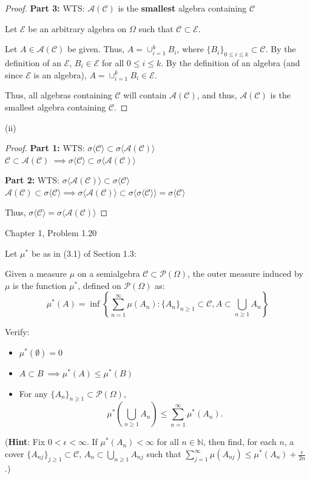 \documentclass[12pt,letterpaper, onecolumn]{exam}
\newcommand{\nat}{\mathbb{N}}
\newcommand{\power}{\mathcal{P}}
\newcommand{\calA}{\mathcal{A}}
\newcommand{\calC}{\mathcal{C}}
\newcommand{\gensig}[1]{\sigma\langle #1 \rangle} %
\newcommand{\om}{\mu^*} %
\begin{document}
\begin{questions}
\begin{solution}
\begin{proof}
    \textbf{Part 3:} WTS: $\calA(\calC)$ is the \textbf{smallest} algebra containing $\calC$

    Let $\mathcal{E}$ be an arbitrary algebra on $\Omega$ such that $\calC \subset \mathcal{E}$.

    Let $A \in \calA(\calC)$ be given. Thus, $A = \cup_{i = 1}^k B_i$, where $\{B_i\}_{0 \leq i \leq k} \subset \calC$. By the definition of an $\mathcal{E}$, $B_i \in \mathcal{E}$ for all $0 \leq i \leq k$. By the definition of an algebra (and since $\mathcal{E}$ is an algebra), $A = \cup_{i = 1}^k B_i \in \mathcal{E}$.
    
    Thus, all algebras containing $\calC$ will contain $\calA(\calC)$, and thus, $\calA(\calC)$ is the smallest algebra containing $\calC$.
    \end{proof}
    
    (ii)
    \begin{proof}
        \textbf{Part 1:} WTS: $\gensig{\calC} \subset \gensig{\calA(\calC)}$ \\
        $\calC \subset \calA(\calC) \: \implies \gensig{\calC} \subset \gensig{\calA(\calC)}$


        \textbf{Part 2:} WTS: $ \gensig{\calA(\calC)} \subset \gensig{\calC}$ \\
        $\calA(\calC) \subset \gensig{\calC} \implies \gensig{\calA(\calC)} \subset \gensig{\gensig{\calC}} = \gensig{\calC}$

        Thus, $\gensig{\calC} = \gensig{\calA(\calC)}$
    \end{proof}
    \end{solution}

    \question Chapter 1, Problem 1.20
    
    Let $\mu^*$ be as in (3.1) of Section 1.3: 
    
    Given a measure $\mu$ on a semialgebra $\calC \subset \power(\Omega)$, the outer measure induced by $\mu$ is the function $\mu^*$, defined on $\power(\Omega)$ as:
            \[\mu^*(A) = \inf\left\{\sum_{n = 1}^\infty \mu(A_n): \{A_n\}_{n \geq 1} \subset \calC, A \subset \bigcup_{n \geq 1} A_n\right\}\]
            
    Verify:
    \begin{itemize}
        \item[(3.4)] $\om (\emptyset) = 0$
        \item[(3.5)] $A \subset B \: \implies \om(A) \leq \om(B)$
        \item[(3.6)] For any $\{A_n\}_{n \geq 1} \subset \power(\Omega)$, 
        \[\om\left(\bigcup_{n \geq 1} A_n\right) \leq \sum_{n = 1}^\infty \om(A_n).\]
    \end{itemize}
    (\textbf{Hint}: Fix $0 <\epsilon<\infty$. If $\mu^*(A_n) < \infty$ for all $n \in \nat$, then find, for each $n$, a cover $\{A_{nj}\}_{j\geq 1} \subset \calC$, $A_n \subset \bigcup_{n\geq 1}A_{nj}$ such that $\sum^\infty_{j=1} \mu(A_{nj}) \leq \mu^*(A_n) + \frac{\epsilon}{2n}$.)


\end{questions}
\end{document}
